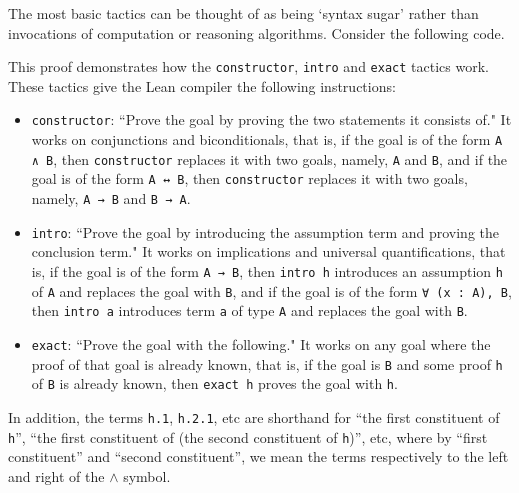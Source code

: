 The most basic tactics can be thought of as being `syntax sugar' rather than invocations of computation or reasoning algorithms. Consider the following code.

This proof demonstrates how the \lstinline|constructor|, \lstinline|intro| and \lstinline|exact| tactics work. These tactics give the Lean compiler the following instructions:
\begin{itemize}
    \item \lstinline|constructor|: ``Prove the goal by proving the two statements it consists of." It works on conjunctions and biconditionals, that is, if the goal is of the form \lstinline|A ∧ B|, then \lstinline|constructor| replaces it with two goals, namely, \lstinline|A| and \lstinline|B|, and if the goal is of the form \lstinline|A ↔ B|, then \lstinline|constructor| replaces it with two goals, namely, \lstinline|A → B| and \lstinline|B → A|.
    
    \item \lstinline|intro|: ``Prove the goal by introducing the assumption term and proving the conclusion term." It works on implications and universal quantifications, that is, if the goal is of the form \lstinline|A → B|, then \lstinline|intro h| introduces an assumption \lstinline|h| of \lstinline|A| and replaces the goal with \lstinline|B|, and if the goal is of the form \lstinline|∀ (x : A), B|, then \lstinline|intro a| introduces term \lstinline|a| of type \lstinline|A| and replaces the goal with \lstinline|B|.

    \item \lstinline|exact|: ``Prove the goal with the following." It works on any goal where the proof of that goal is already known, that is, if the goal is \verb|B| and some proof \lstinline|h| of \lstinline|B| is already known, then \lstinline|exact h| proves the goal with \lstinline|h|.
\end{itemize}

In addition, the terms \lstinline|h.1|, \lstinline|h.2.1|, etc are shorthand for ``the first constituent of \lstinline|h|'', ``the first constituent of (the second constituent of \lstinline|h|)'', etc, where by ``first constituent'' and ``second constituent'', we mean the terms respectively to the left and right of the $\land$ symbol.

